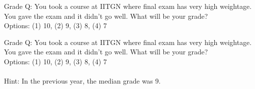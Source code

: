 \documentclass[handout]{beamer}
\begin{document}
\newcommand{\StudyQ}{Q: You took a course at IITGN where final exam has very high weightage. You gave the exam and it didn't go well. What will be your grade?\\
    Options: (1) 10, (2) 9, (3) 8, (4) 7}

\begin{frame}{Grade}
    \StudyQ
\end{frame}

\begin{frame}{Grade}
    \StudyQ \\
    \hfill \\
    Hint: In the previous year, the median grade was 9.
\end{frame}
\end{document}
